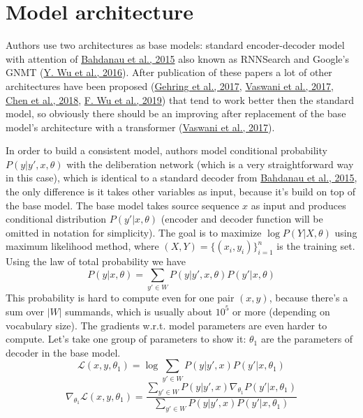 \documentclass{article}
\begin{document}
\section{Model architecture}
	Authors use two architectures as base models: standard encoder-decoder model with attention of \hyperref[itm:bahdanau]{Bahdanau et al., 2015} also known as RNNSearch and Google's GNMT (\hyperref[itm:gnmt]{Y. Wu et al., 2016}). After publication of these papers a lot of other architectures have been proposed
   (\hyperref[itm:conv_seq2seq]{Gehring et al., 2017},
    \hyperref[itm:transformer]{Vaswani et al., 2017},
    \hyperref[itm:the_best_of_both_worlds]{Chen et al., 2018},
    \hyperref[itm:pay_less_attention]{F. Wu et al., 2019}) that tend to work better then the standard model, so obviously there should be an improving after replacement of the base model's architecture with a transformer (\hyperref[itm:transformer]{Vaswani et al., 2017}).

    In order to build a consistent model, authors model conditional probability $P(y | y', x, \theta)$ with the deliberation network (which is a very straightforward way in this case), which is identical to a standard decoder from \hyperref[itm:bahdanau]{Bahdanau et al., 2015}, the only difference is it takes other variables as input, because it's build on top of the base model. The base model takes source sequence $x$ as input and produces conditional distribution $P(y' | x, \theta)$ (encoder and decoder function will be omitted in notation for simplicity). The goal is to maximize $\log P(Y | X, \theta)$ using maximum likelihood method, where $(X, Y) = \{(x_i, y_i)\}_{i = 1}^n$ is the training set. Using the law of total probability we have $$P(y | x, \theta) = \sum\limits_{y' \in W} P(y | y', x, \theta) P(y' | x, \theta)$$ This probability is hard to compute even for one pair $(x, y)$, because there's a sum over $|W|$ summands, which is usually about $10^{5}$ or more (depending on vocabulary size). The gradients w.r.t. model parameters are even harder to compute. Let's take one group of parameters to show it: $\theta_1$ are the parameters of decoder in the base model.
    $$\mathcal{L}(x, y, \theta_1) = \log \sum_{y' \in W} P(y | y', x) P(y' | x, \theta_1)$$
    $$\nabla_{\theta_1} \mathcal{L}(x, y, \theta_1) = \frac{\sum\limits_{y' \in W} P(y | y', x) \nabla_{\theta_1} P(y' | x, \theta_1)}{\sum\limits_{y' \in W} P(y | y', x) P(y' | x, \theta_1)}$$
\end{document}
